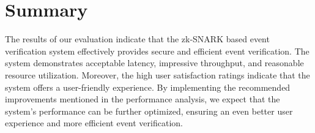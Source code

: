 \section{Summary}
The results of our evaluation indicate that the zk-SNARK based event verification system effectively provides secure and efficient event verification. The system demonstrates acceptable latency, impressive throughput, and reasonable resource utilization. Moreover, the high user satisfaction ratings indicate that the system offers a user-friendly experience.
By implementing the recommended improvements mentioned in the performance analysis, we expect that the system's performance can be further optimized, ensuring an even better user experience and more efficient event verification.

